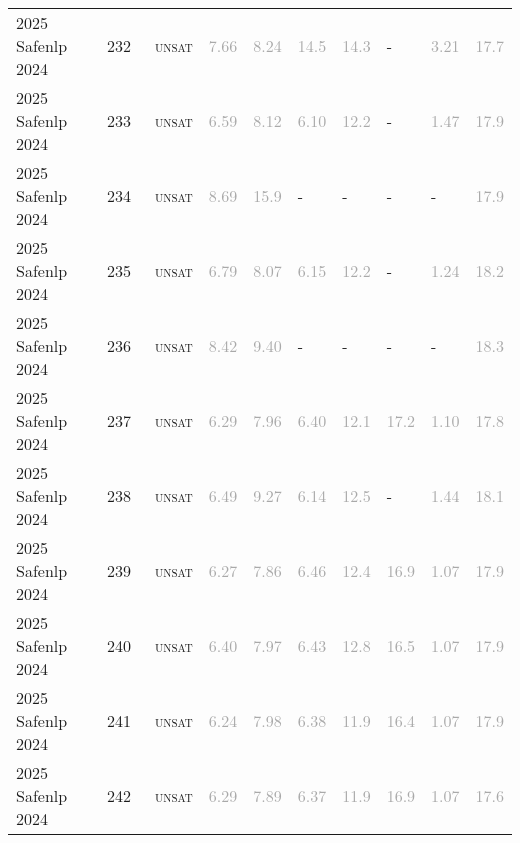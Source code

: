 \begin{center}
{\begin{longtable}{@{}llllllllll@{}}
2025 Safenlp 2024 & 232 & ~\textsc{unsat} & \textcolor{darkgray}{7.66} & \textcolor{darkgray}{8.24} & \textcolor{darkgray}{14.5} & \textcolor{darkgray}{14.3} & - & \textcolor{darkgray}{3.21} & \textcolor{darkgray}{17.7} \\
2025 Safenlp 2024 & 233 & ~\textsc{unsat} & \textcolor{darkgray}{6.59} & \textcolor{darkgray}{8.12} & \textcolor{darkgray}{6.10} & \textcolor{darkgray}{12.2} & - & \textcolor{darkgray}{1.47} & \textcolor{darkgray}{17.9} \\
2025 Safenlp 2024 & 234 & ~\textsc{unsat} & \textcolor{darkgray}{8.69} & \textcolor{darkgray}{15.9} & - & - & - & - & \textcolor{darkgray}{17.9} \\
2025 Safenlp 2024 & 235 & ~\textsc{unsat} & \textcolor{darkgray}{6.79} & \textcolor{darkgray}{8.07} & \textcolor{darkgray}{6.15} & \textcolor{darkgray}{12.2} & - & \textcolor{darkgray}{1.24} & \textcolor{darkgray}{18.2} \\
2025 Safenlp 2024 & 236 & ~\textsc{unsat} & \textcolor{darkgray}{8.42} & \textcolor{darkgray}{9.40} & - & - & - & - & \textcolor{darkgray}{18.3} \\
2025 Safenlp 2024 & 237 & ~\textsc{unsat} & \textcolor{darkgray}{6.29} & \textcolor{darkgray}{7.96} & \textcolor{darkgray}{6.40} & \textcolor{darkgray}{12.1} & \textcolor{darkgray}{17.2} & \textcolor{darkgray}{1.10} & \textcolor{darkgray}{17.8} \\
2025 Safenlp 2024 & 238 & ~\textsc{unsat} & \textcolor{darkgray}{6.49} & \textcolor{darkgray}{9.27} & \textcolor{darkgray}{6.14} & \textcolor{darkgray}{12.5} & - & \textcolor{darkgray}{1.44} & \textcolor{darkgray}{18.1} \\
2025 Safenlp 2024 & 239 & ~\textsc{unsat} & \textcolor{darkgray}{6.27} & \textcolor{darkgray}{7.86} & \textcolor{darkgray}{6.46} & \textcolor{darkgray}{12.4} & \textcolor{darkgray}{16.9} & \textcolor{darkgray}{1.07} & \textcolor{darkgray}{17.9} \\
2025 Safenlp 2024 & 240 & ~\textsc{unsat} & \textcolor{darkgray}{6.40} & \textcolor{darkgray}{7.97} & \textcolor{darkgray}{6.43} & \textcolor{darkgray}{12.8} & \textcolor{darkgray}{16.5} & \textcolor{darkgray}{1.07} & \textcolor{darkgray}{17.9} \\
2025 Safenlp 2024 & 241 & ~\textsc{unsat} & \textcolor{darkgray}{6.24} & \textcolor{darkgray}{7.98} & \textcolor{darkgray}{6.38} & \textcolor{darkgray}{11.9} & \textcolor{darkgray}{16.4} & \textcolor{darkgray}{1.07} & \textcolor{darkgray}{17.9} \\
2025 Safenlp 2024 & 242 & ~\textsc{unsat} & \textcolor{darkgray}{6.29} & \textcolor{darkgray}{7.89} & \textcolor{darkgray}{6.37} & \textcolor{darkgray}{11.9} & \textcolor{darkgray}{16.9} & \textcolor{darkgray}{1.07} & \textcolor{darkgray}{17.6} \\

\end{longtable}}
\end{center}
